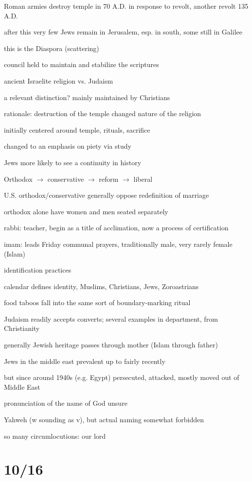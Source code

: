 \documentclass[12pt]{article}
\begin{document}
Roman armies destroy temple in 70 A.D. in response to revolt, another revolt 135 A.D.

after this very few Jews remain in Jerusalem, esp. in south, some still in Galilee

this is the Diaspora (scattering)

council held to maintain and stabilize the scriptures

\noindent
ancient Israelite religion vs. Judaism

a relevant distinction? mainly maintained by Christians

rationale: destruction of the temple changed nature of the religion

initially centered around temple, rituals, sacrifice

changed to an emphasis on piety via study

Jews more likely to see a continuity in history

\noindent
Orthodox $\to$ conservative $\to$ reform $\to$ liberal

U.S. orthodox/conservative generally oppose redefinition of marriage

orthodox alone have women and men seated separately

rabbi: teacher, begin as a title of acclimation, now a process of certification

imam: leads Friday communal prayers, traditionally male, very rarely female (Islam)

\noindent
identification practices

calendar defines identity, Muslims, Christians, Jews, Zoroastrians

food taboos fall into the same sort of boundary-marking ritual

Judaism readily accepts converts; several examples in department, from Christianity

generally Jewish heritage passes through mother (Islam through father)

\noindent
Jews in the middle east prevalent up to fairly recently

but since around 1940s (e.g. Egypt) persecuted, attacked, mostly moved out of Middle East

\noindent
pronunciation of the name of God unsure

Yahweh (w sounding as v), but actual naming somewhat forbidden

so many circumlocutions: our lord

\section{10/16}
\end{document}
